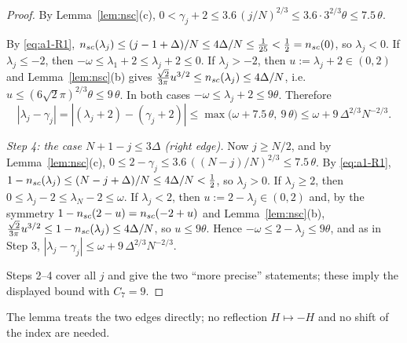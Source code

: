 \begin{proof}
By Lemma~\ref{lem:nsc}(c), $0<\gamma_j+2\le3.6\,(j/N)^{2/3}\le3.6\cdot3^{2/3}\theta\le7.5\,\theta$.

By \eqref{eq:a1-R1}, $n_{sc}(\lambda_j)\le(j-1+\Delta)/N\le4\Delta/N\le\frac1{25}<\frac12=n_{sc}(0)$, so $\lambda_j<0$. If $\lambda_j\le-2$, then $-\omega\le\lambda_1+2\le\lambda_j+2\le0$. If $\lambda_j>-2$, then $u:=\lambda_j+2\in(0,2)$ and Lemma~\ref{lem:nsc}(b) gives
$\frac{\sqrt2}{3\pi}u^{3/2}\le n_{sc}(\lambda_j)\le4\Delta/N$, i.e.\ $u\le(6\sqrt2\pi)^{2/3}\theta\le9\,\theta$. In both cases $-\omega\le\lambda_j+2\le9\theta$. Therefore
\[
 |\lambda_j-\gamma_j|=|(\lambda_j+2)-(\gamma_j+2)|\le\max\big(\omega+7.5\,\theta,\ 9\,\theta\big)\le\omega+9\,\Delta^{2/3}N^{-2/3}.
\]

\emph{Step 4: the case $N+1-j\le3\Delta$ (right edge).} Now $j\ge N/2$, and by Lemma~\ref{lem:nsc}(c), $0\le2-\gamma_j\le3.6\,((N-j)/N)^{2/3}\le7.5\,\theta$.
By \eqref{eq:a1-R1}, $1-n_{sc}(\lambda_j)\le(N-j+\Delta)/N\le4\Delta/N<\frac12$, so $\lambda_j>0$. If $\lambda_j\ge2$, then $0\le\lambda_j-2\le\lambda_N-2\le\omega$. If $\lambda_j<2$, then $u:=2-\lambda_j\in(0,2)$ and, by the symmetry $1-n_{sc}(2-u)=n_{sc}(-2+u)$ and Lemma~\ref{lem:nsc}(b),
$\frac{\sqrt2}{3\pi}u^{3/2}\le1-n_{sc}(\lambda_j)\le4\Delta/N$, so $u\le9\theta$. Hence $-\omega\le2-\lambda_j\le9\theta$, and as in Step 3, $|\lambda_j-\gamma_j|\le\omega+9\,\Delta^{2/3}N^{-2/3}$.

Steps 2--4 cover all $j$ and give the two ``more precise'' statements; these imply the displayed bound with $C_7=9$.
\end{proof}
\noindent The lemma treats the two edges directly; no reflection $H\mapsto-H$ and no shift of the index are needed.

